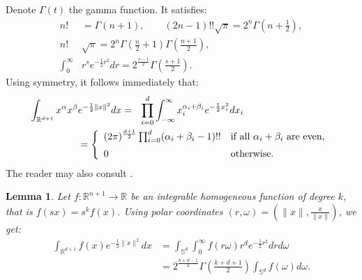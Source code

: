 \documentclass{amsart}
\newcommand{\R}{\mathbb{R}}
\renewcommand{\S}{\mathbb{S}}
\theoremstyle{plain}
\newtheorem{lemma}[theorem]{Lemma}
\theoremstyle{definition}
\theoremstyle{remark}
\begin{document}
Denote $\Gamma(t)$ the gamma function. It satisfies:
\begin{align}
n!&=\Gamma(n+1),\qquad (2n-1)!!\sqrt{\pi} =2^{n}\Gamma\left(n+\tfrac{1}{2}\right), \\
\label{doublegamma}
n!&\sqrt{\pi}=2^{n}\Gamma\left(\tfrac{n}{2}+1\right)\Gamma\left(\tfrac{n+1}{2}\right) ,\\
\int_0^\infty& r^se^{-\frac{1}{2}r^2} dr = 2^{\frac{s-1}{2}}\Gamma\left(\tfrac{s+1}{2}\right).
\end{align}
Using symmetry, it follows immediately that:
\begin{align}    \label{monoint}
 \int_{\R^{d+1}}x^\alpha x^\beta & e^{-\frac{1}{2}\|x\|^2} dx = \ \ 
\displaystyle \prod_{i=0}^d \int_{-\infty}^\infty x_i^{\alpha_i+\beta_i} e^{-\frac{1}{2}x_i^2} dx_i \\
 &= \left\{
\begin{array}{*2{l}p{5cm}}
(2 \pi)^{\frac{d+1}{2}}\prod_{i=0}^d (\alpha_i+\beta_i-1)!! &\text{if all }\alpha_i+\beta_i\text{ are even}, \vspace{0.2cm} \\ 
 0 &\text{otherwise}.
\end{array}
  \right.\nonumber
\end{align}
The reader may also consult \cite{Folland}.
\begin{lemma}\label{homosphere}
Let $f:\R^{n+1}\rightarrow\R$ be an integrable homogeneous function of degree $k$, that is $f(sx) = s^kf(x)$. Using polar coordinates $(r,\omega) = (\|x\|,\frac{x}{\|x\|})$, we get:
\begin{align*}
\int_{\R^{d+1}}f(x)e^{-\frac{1}{2}\|x\|^2} dx &= \int_{\S^d}\!\int_0^\infty\! f(r\omega) r^d e^{-\frac{1}{2}r^2}dr d\omega \\
&= 2^{\frac{k+d-1}{2}}\Gamma\left(\tfrac{k+d+1}{2}\right)\int_{\S^d}f(\omega)d\omega .
\end{align*}
\end{lemma}
\end{document}
